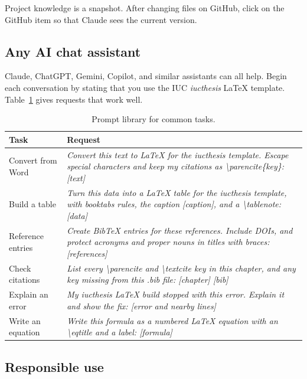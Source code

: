 \documentclass[11pt,a4paper]{article}
\newcommand\thd[1]{\bfseries #1}
\begin{document}
Project knowledge is a snapshot. After changing files on GitHub, click
 on the GitHub item so that Claude sees the current version.

\subsection{Any AI chat assistant}

Claude, ChatGPT, Gemini, Copilot, and similar assistants can all help. Begin
each conversation by stating that you use the IUC \emph{iucthesis} LaTeX
template. Table~\ref{tab:prompts} gives requests that work well.

\begin{table}[htbp]
\caption{Prompt library for common tasks.}
\label{tab:prompts}
\small
\begin{tabularx}{\textwidth}{@{}p{30mm}X@{}}
\toprule
\thd{Task} & \thd{Request} \\
\midrule
Convert from Word   & \emph{Convert this text to LaTeX for the iucthesis template. Escape special characters and keep my citations as \textbackslash parencite\{key\}: [text]} \\
Build a table       & \emph{Turn this data into a LaTeX table for the iucthesis template, with booktabs rules, the caption [caption], and a \textbackslash tablenote: [data]} \\
Reference entries   & \emph{Create BibTeX entries for these references. Include DOIs, and protect acronyms and proper nouns in titles with braces: [references]} \\
Check citations     & \emph{List every \textbackslash parencite and \textbackslash textcite key in this chapter, and any key missing from this .bib file: [chapter] [bib]} \\
Explain an error    & \emph{My iucthesis LaTeX build stopped with this error. Explain it and show the fix: [error and nearby lines]} \\
Write an equation   & \emph{Write this formula as a numbered LaTeX equation with an \textbackslash eqtitle and a label: [formula]} \\
\bottomrule
\end{tabularx}
\end{table}

\subsection{Responsible use}
\end{document}
